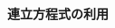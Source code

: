 \documentclass[17pt,b4paper, landscape]{ltjsarticle}%
\begin{document}
{\textbf{\Large{連立方程式の利用}}}\hspace{\fill}{\scalebox{1.5}{（　）組（　　　　　　　　）}}\\
\begin{multicols*}{3}
\vfill\null\columnbreak

	 \vfill\null\columnbreak

	 \vfill\null\columnbreak

\end{multicols*}
\end{document}
